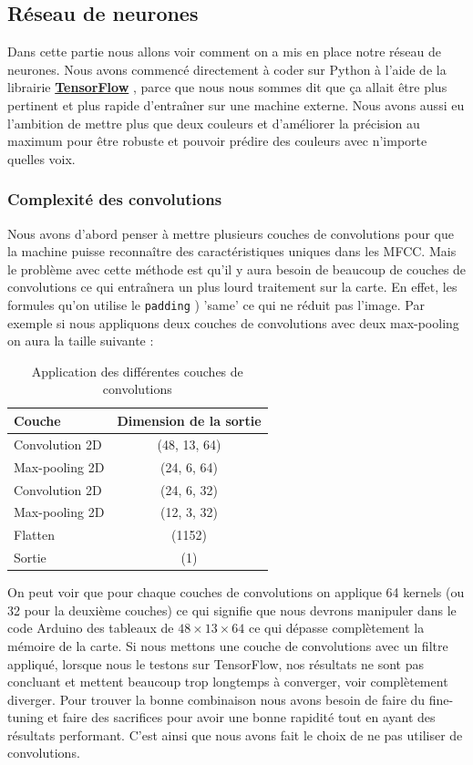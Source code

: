 \documentclass[a4paper,11pt]{article}
\begin{document}
\subsection{Réseau de neurones} \label{dev:reseau}

Dans cette partie nous allons voir comment on a mis en place notre réseau de neurones. Nous avons commencé directement à coder sur Python à l'aide de la librairie \href{https://www.tensorflow.org/}{\textbf{TensorFlow}} \cite{tensorflow}, parce que nous nous sommes dit que ça allait être plus pertinent et plus rapide d'entraîner sur une machine externe. Nous avons aussi eu l'ambition de mettre plus que deux couleurs et d'améliorer la précision au maximum pour être robuste et pouvoir prédire des couleurs avec n'importe quelles voix.

\subsubsection{Complexité des convolutions} \label{convolutions}
Nous avons d'abord penser à mettre plusieurs couches de convolutions pour que la machine puisse reconnaître des caractéristiques uniques dans les MFCC. Mais le problème avec cette méthode est qu'il y aura besoin de beaucoup de couches de convolutions ce qui entraînera un plus lourd traitement sur la carte. En effet, les formules qu'on utilise le \texttt{padding} ) 'same' ce qui ne réduit pas l'image. Par exemple si nous appliquons deux couches de convolutions avec deux max-pooling on aura la taille suivante : 

\begin{table}[H]
\begin{center}
\begin{tabular}{lc}
\toprule
\textbf{Couche} & \textbf{Dimension de la sortie} \\
\midrule
Convolution 2D & (48, 13, 64) \\
Max-pooling 2D & (24, 6, 64) \\
Convolution 2D & (24, 6, 32) \\
Max-pooling 2D & (12, 3, 32) \\
Flatten & (1152) \\
Sortie & (1) \\
\bottomrule
\end{tabular}
\end{center}
\caption{Application des différentes couches de convolutions}
\end{table} 
On peut voir que pour chaque couches de convolutions on applique 64 kernels (ou 32 pour la deuxième couches) ce qui signifie que nous devrons manipuler dans le code Arduino des tableaux de $48 \times 13 \times 64$ ce qui dépasse complètement la mémoire de la carte. Si nous mettons une couche de convolutions avec un filtre appliqué, lorsque nous le testons sur TensorFlow, nos résultats ne sont pas concluant et mettent beaucoup trop longtemps à converger, voir complètement diverger. Pour trouver la bonne combinaison nous avons besoin de faire du fine-tuning et faire des sacrifices pour avoir une bonne rapidité tout en ayant des résultats performant. C'est ainsi que nous avons fait le choix de ne pas utiliser de convolutions.
\end{document}
